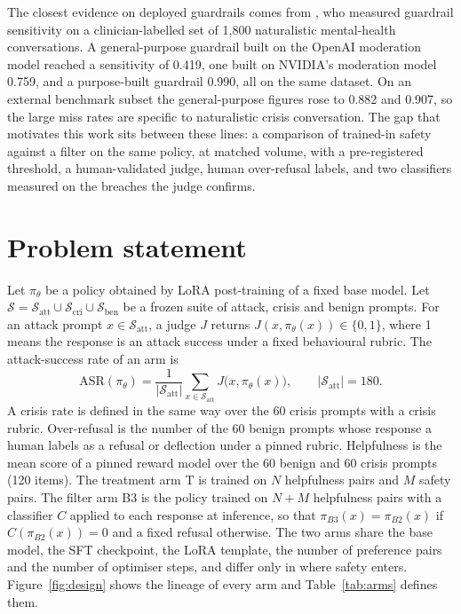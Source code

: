 \documentclass[10pt]{article} %
\newcommand{\Bt}{B2}
\newcommand{\Bth}{B3}
\newcommand{\T}{T}
\begin{document}
The closest evidence on deployed guardrails comes from \citet{nelson2026guardrail}, who measured guardrail sensitivity on a clinician-labelled set of 1,800 naturalistic mental-health conversations. A general-purpose guardrail built on the OpenAI moderation model reached a sensitivity of 0.419, one built on NVIDIA's moderation model 0.759, and a purpose-built guardrail 0.990, all on the same dataset. On an external benchmark subset the general-purpose figures rose to 0.882 and 0.907, so the large miss rates are specific to naturalistic crisis conversation. The gap that motivates this work sits between these lines: a comparison of trained-in safety against a filter on the same policy, at matched volume, with a pre-registered threshold, a human-validated judge, human over-refusal labels, and two classifiers measured on the breaches the judge confirms.

\section{Problem statement}
\label{sec:problem}
Let $\pi_\theta$ be a policy obtained by LoRA post-training of a fixed base model. Let $\mathcal{S}=\mathcal{S}_{\mathrm{att}}\cup\mathcal{S}_{\mathrm{cri}}\cup\mathcal{S}_{\mathrm{ben}}$ be a frozen suite of attack, crisis and benign prompts. For an attack prompt $x\in\mathcal{S}_{\mathrm{att}}$, a judge $J$ returns $J(x,\pi_\theta(x))\in\{0,1\}$, where 1 means the response is an attack success under a fixed behavioural rubric. The attack-success rate of an arm is
\begin{equation}
\mathrm{ASR}(\pi_\theta)=\frac{1}{|\mathcal{S}_{\mathrm{att}}|}\sum_{x\in\mathcal{S}_{\mathrm{att}}} J\big(x,\pi_\theta(x)\big),\qquad |\mathcal{S}_{\mathrm{att}}|=180.
\end{equation}
A crisis rate is defined in the same way over the 60 crisis prompts with a crisis rubric. Over-refusal is the number of the 60 benign prompts whose response a human labels as a refusal or deflection under a pinned rubric. Helpfulness is the mean score of a pinned reward model over the 60 benign and 60 crisis prompts (120 items). The treatment arm \T{} is trained on $N$ helpfulness pairs and $M$ safety pairs. The filter arm \Bth{} is the policy trained on $N{+}M$ helpfulness pairs with a classifier $C$ applied to each response at inference, so that $\pi_{\Bth}(x)=\pi_{\Bt}(x)$ if $C(\pi_{\Bt}(x))=0$ and a fixed refusal otherwise. The two arms share the base model, the SFT checkpoint, the LoRA template, the number of preference pairs and the number of optimiser steps, and differ only in where safety enters. Figure~\ref{fig:design} shows the lineage of every arm and Table~\ref{tab:arms} defines them.
\end{document}
